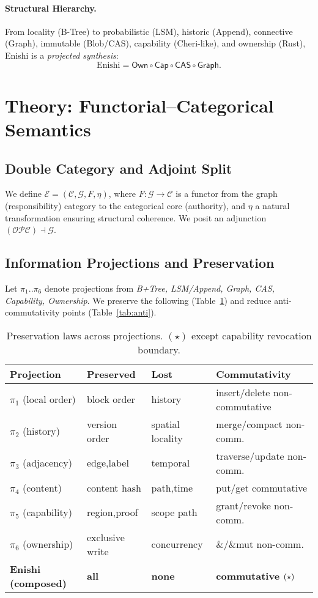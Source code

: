 \documentclass[10pt]{article}
\begin{document}
\paragraph{Structural Hierarchy.}
From locality (B-Tree) to probabilistic (LSM), historic (Append), connective (Graph),
immutable (Blob/CAS), capability (Cheri-like), and ownership (Rust), Enishi is a \emph{projected synthesis}:
\[
\text{Enishi} = \mathsf{Own} \circ \mathsf{Cap} \circ \mathsf{CAS} \circ \mathsf{Graph}.
\]

\section{Theory: Functorial--Categorical Semantics}
\subsection{Double Category and Adjoint Split}
We define $\mathcal{E} = (\mathcal{C},\mathcal{G},F,\eta)$, where
$F:\mathcal{G}\to\mathcal{C}$ is a functor from the graph (responsibility) category to the categorical core (authority),
and $\eta$ a natural transformation ensuring structural coherence. We posit an adjunction
$(\mathcal{O}\mathcal{P}\mathcal{C}) \dashv \mathcal{G}$.

\subsection{Information Projections and Preservation}
Let $\pi_1.. \pi_6$ denote projections from \emph{B+Tree, LSM/Append, Graph, CAS, Capability, Ownership}.
We preserve the following (Table~\ref{tab:preserve}) and reduce anti-commutativity points (Table~\ref{tab:anti}).

\begin{table}[h]
\centering
\small
\begin{tabularx}{\linewidth}{l l l l}
\toprule
Projection & Preserved & Lost & Commutativity \\
\midrule
$\pi_1$ (local order) & block order & history & insert/delete non-commutative \\
$\pi_2$ (history) & version order & spatial locality & merge/compact non-comm. \\
$\pi_3$ (adjacency) & edge,label & temporal & traverse/update non-comm. \\
$\pi_4$ (content) & content hash & path,time & put/get commutative \\
$\pi_5$ (capability) & region,proof & scope path & grant/revoke non-comm. \\
$\pi_6$ (ownership) & exclusive write & concurrency & \&/\&mut non-comm. \\
\textbf{Enishi (composed)} & \textbf{all} & \textbf{none} & \textbf{commutative $\small(\star)$} \\
\bottomrule
\end{tabularx}
\caption{Preservation laws across projections. $(\star)$ except capability revocation boundary.}
\label{tab:preserve}
\end{table}
\end{document}
